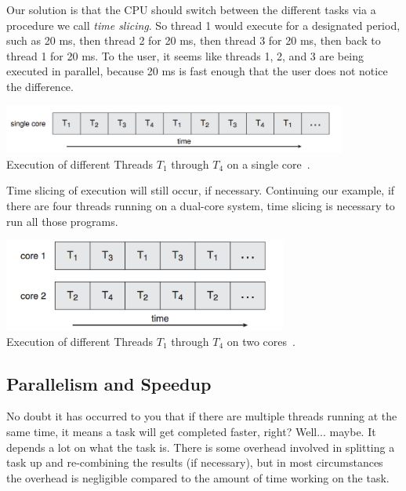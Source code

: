 Our solution is that the CPU should switch between the different tasks via a procedure we call \textit{time slicing}. So thread 1 would execute for a designated period, such as 20 ms, then thread 2 for 20 ms, then thread 3 for 20 ms, then back to thread 1 for 20 ms. To the user, it seems like threads 1, 2, and 3 are being executed in parallel, because 20 ms is fast enough that the user does not notice the difference.

\begin{center}
	\includegraphics[width=0.85\textwidth]{images/single-core-execution.png}\\
	Execution of different Threads $T_{1}$ through $T_{4}$ on a single core~\cite{osc}.
\end{center}

Time slicing of execution will still occur, if necessary. Continuing our example, if there are four threads running on a dual-core system, time slicing is necessary to run all those programs.

\begin{center}
	\includegraphics[width=0.7\textwidth]{images/dual-core-execution.png}\\
	Execution of different Threads $T_{1}$ through $T_{4}$ on two cores~\cite{osc}.
\end{center}

\subsection*{Parallelism and Speedup}

No doubt it has occurred to you that if there are multiple threads running at the same time, it means a task will get completed faster, right? Well... maybe. It depends a lot on what the task is. There is some overhead involved in splitting a task up and re-combining the results (if necessary), but in most circumstances the overhead is negligible compared to the amount of time working on the task.  

